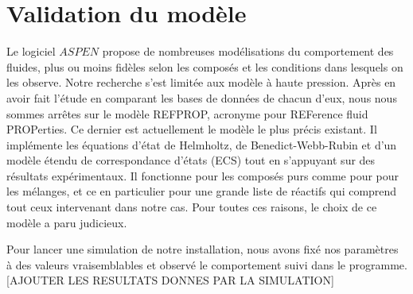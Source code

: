 \documentclass[a4paper, oneside, 12pt]{article}
\begin{document}
\section{Validation du modèle}

Le logiciel $ASPEN$ propose de nombreuses modélisations du comportement des fluides, 
plus ou moins fidèles selon les composés et les conditions dans lesquels on les observe. 
Notre recherche s'est limitée aux modèle à haute pression. 
Après en avoir fait l'étude en comparant les bases de données de chacun d'eux, 
nous nous sommes arrêtes sur le modèle REFPROP, acronyme pour REFerence fluid PROPerties. 
Ce dernier est actuellement le modèle le plus précis existant. 
Il implémente les équations d'état de Helmholtz, de Benedict-Webb-Rubin 
et d'un modèle étendu de correspondance d'états (ECS) tout en s'appuyant sur des résultats expérimentaux. 
Il fonctionne pour les composés purs comme pour pour les mélanges, 
et ce en particulier pour une grande liste de réactifs qui comprend tout ceux intervenant dans notre cas. 
Pour toutes ces raisons, le choix de ce modèle a paru judicieux.

Pour lancer une simulation de notre installation, 
nous avons fixé nos paramètres à des valeurs vraisemblables 
et observé le comportement suivi dans le programme. 
[AJOUTER LES RESULTATS DONNES PAR LA SIMULATION]
\end{document}
